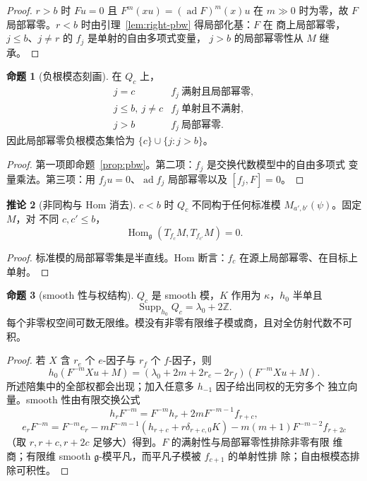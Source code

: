 \documentclass[UTF8,11pt]{ctexart}
\newcommand{\Z}{\mathbb Z}
\newcommand{\g}{\mathfrak g}
\newcommand{\ad}{\operatorname{ad}}
\newcommand{\Hom}{\operatorname{Hom}}
\newcommand{\Supp}{\operatorname{Supp}}
\theoremstyle{definition}
\newtheorem{proposition}{命题}[section]
\newtheorem{corollary}[proposition]{推论}
\begin{document}
\begin{proof}
\(r>b\) 时 \(Fu=0\) 且 \(F^m(xu)=(\ad F)^m(x)u\) 在 \(m\gg0\) 时为零，故
\(F\) 局部幂零。\(r<b\) 时由引理~\ref{lem:right-pbw} 得局部化基：\(F\) 在
商上局部幂零，\(j\le b\)、\(j\ne r\) 的 \(f_j\) 是单射的自由多项式变量，
\(j>b\) 的局部幂零性从 \(M\) 继承。
\end{proof}

\begin{proposition}[负根模态刻画]\label{prop:root}
在 \(Q_c\) 上，
\[
\begin{array}{c|l}
j=c&f_j\ \text{满射且局部幂零},\\
j\le b,\ j\ne c&f_j\ \text{单射且不满射},\\
j>b&f_j\ \text{局部幂零}.
\end{array}
\]
因此局部幂零负根模态集恰为 \(\{c\}\cup\{j:j>b\}\)。
\end{proposition}

\begin{proof}
第一项即命题~\ref{prop:pbw}。第二项：\(f_j\) 是交换代数模型中的自由多项式
变量乘法。第三项：用 \(f_ju=0\)、\(\ad f_j\) 局部幂零以及 \([f_j,F]=0\)。
\end{proof}

\begin{corollary}[非同构与 Hom 消去]\label{cor:hom}
\(c<b\) 时 \(Q_c\) 不同构于任何标准模 \(M_{a',b'}(\psi)\)。固定 \(M\)，对
不同 \(c,c'\le b\)，
\[
\Hom_\g(T_{f_c}M,T_{f_{c'}}M)=0.
\]
\end{corollary}

\begin{proof}
标准模的局部幂零集是半直线。Hom 断言：\(f_c\) 在源上局部幂零、在目标上
单射。
\end{proof}

\begin{proposition}[smooth 性与权结构]\label{prop:smooth}
\(Q_c\) 是 smooth 模，\(K\) 作用为 \(\kappa\)，\(h_0\) 半单且
\[
\Supp_{h_0}Q_c=\lambda_0+2\Z.
\]
每个非零权空间可数无限维。模没有非零有限维子模或商，且对全仿射代数不可
积。
\end{proposition}

\begin{proof}
若 \(X\) 含 \(r_e\) 个 \(e\)-因子与 \(r_f\) 个 \(f\)-因子，则
\[
h_0(F^{-m}Xu+M)=(\lambda_0+2m+2r_e-2r_f)(F^{-m}Xu+M).
\]
所述陪集中的全部权都会出现；加入任意多 \(h_{-1}\) 因子给出同权的无穷多个
独立向量。smooth 性由有限交换公式
\[
h_rF^{-m}=F^{-m}h_r+2mF^{-m-1}f_{r+c},
\]
\[
e_rF^{-m}=F^{-m}e_r-mF^{-m-1}(h_{r+c}+r\delta_{r+c,0}K)
-m(m+1)F^{-m-2}f_{r+2c}
\]
（取 \(r,r+c,r+2c\) 足够大）得到。\(F\) 的满射性与局部幂零性排除非零有限
维商；有限维 smooth \(\g\)-模平凡，而平凡子模被 \(f_{c+1}\) 的单射性排
除；自由根模态排除可积性。
\end{proof}
\end{document}
